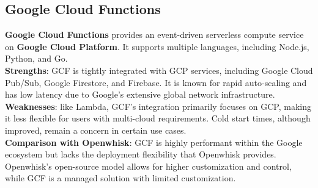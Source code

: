 \subsection{Google Cloud Functions}
\textbf{Google Cloud Functions} provides an event-driven serverless compute service on \textbf{Google Cloud Platform}. It supports multiple languages, including Node.js, Python, and Go.\vspace{14pt}\\
\textbf{Strengths}: GCF is tightly integrated with GCP services, including Google Cloud Pub/Sub, Google Firestore, and Firebase. It is known for rapid auto-scaling and has low latency due to Google’s extensive global network infrastructure.\vspace{14pt}\\
\textbf{Weaknesses}: like Lambda, GCF’s integration primarily focuses on GCP, making it less flexible for users with multi-cloud requirements. Cold start times, although improved, remain a concern in certain use cases.\vspace{14pt}\\
\textbf{Comparison with Openwhisk}: GCF is highly performant within the Google ecosystem but lacks the deployment flexibility that Openwhisk provides. Openwhisk’s open-source model allows for higher customization and control, while GCF is a managed solution with limited customization.
